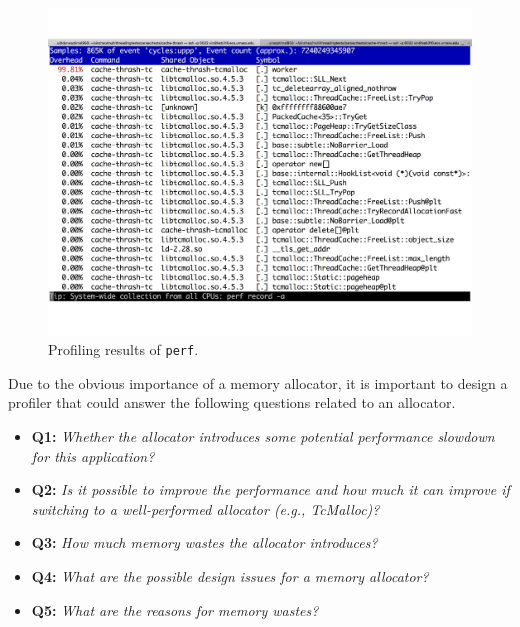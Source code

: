 \begin{figure}[htbp]
\centering
\includegraphics[width=0.95\columnwidth]{figures/perf-cache-thrash-tcmalloc}
\caption{Profiling results of \texttt{perf}. \label{fig:mot1}}
\end{figure}


Due to the obvious importance of a memory allocator, it is important to design a profiler that could answer the following questions related to an allocator. 

\begin{itemize}
\item \textbf{Q1:} \textit{Whether the allocator introduces some potential performance slowdown for this application? }
\item \textbf{Q2:} \textit{Is it possible to improve the performance and how much it can improve if switching to a well-performed allocator (e.g., TcMalloc)?}
\item \textbf{Q3:} \textit{How much memory wastes the allocator introduces?}
\item \textbf{Q4:} \textit{What are the possible design issues for a memory allocator?}
\item \textbf{Q5:} \textit{What are the reasons for memory wastes?} 
\end{itemize}
\vspace{0.1in}


